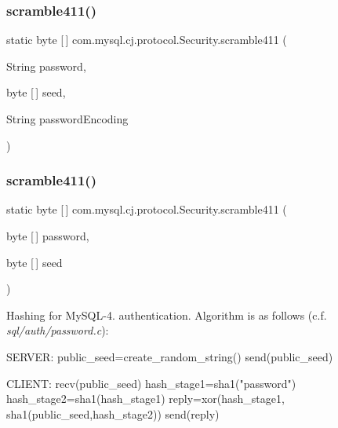 \subsubsection{\texorpdfstring{scramble411()}{scramble411()}\hspace{0.1cm}{\footnotesize\ttfamily [1/2]}}
{\footnotesize\ttfamily static byte \mbox{[}$\,$\mbox{]} com.\+mysql.\+cj.\+protocol.\+Security.\+scramble411 (\begin{DoxyParamCaption}\item[{String}]{password,  }\item[{byte \mbox{[}$\,$\mbox{]}}]{seed,  }\item[{String}]{password\+Encoding }\end{DoxyParamCaption})\hspace{0.3cm}{\ttfamily [static]}}

\mbox{\label{classcom_1_1mysql_1_1cj_1_1protocol_1_1_security_a1459b1e2d3828790e1d8982e65e68b34}} 
\subsubsection{\texorpdfstring{scramble411()}{scramble411()}\hspace{0.1cm}{\footnotesize\ttfamily [2/2]}}
{\footnotesize\ttfamily static byte \mbox{[}$\,$\mbox{]} com.\+mysql.\+cj.\+protocol.\+Security.\+scramble411 (\begin{DoxyParamCaption}\item[{byte \mbox{[}$\,$\mbox{]}}]{password,  }\item[{byte \mbox{[}$\,$\mbox{]}}]{seed }\end{DoxyParamCaption})\hspace{0.3cm}{\ttfamily [static]}}

Hashing for My\+S\+Q\+L-\/4. authentication. Algorithm is as follows (c.\+f. {\itshape sql/auth/password.\+c})\+:


\begin{DoxyPre}
SERVER: public\_seed=create\_random\_string()
send(public\_seed)\end{DoxyPre}



\begin{DoxyPre}CLIENT: recv(public\_seed)
hash\_stage1=sha1("password")
hash\_stage2=sha1(hash\_stage1)
reply=xor(hash\_stage1, sha1(public\_seed,hash\_stage2))
send(reply)
\end{DoxyPre}
 \mbox{\label{classcom_1_1mysql_1_1cj_1_1protocol_1_1_security_a0f3d13ee7c5799791fe54f3857581bfd}} 
